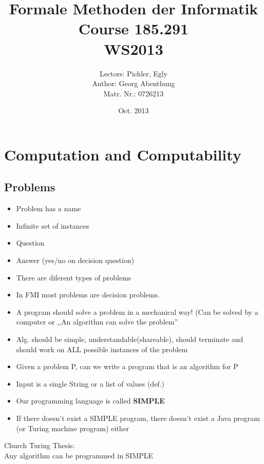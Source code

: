 \documentclass[a4paper]{article}
\begin{document}
	\title{\textbf{Formale Methoden der Informatik}\\ Course 185.291 \\WS2013}
	\author{Lectors: Pichler, Egly \\ Author: Georg Abenthung \\ Matr. Nr.: 0726213
	}
	\date{Oct. 2013}

	\maketitle
	
	\newpage
	
	
	
	\newpage
\section{Computation and Computability}
\subsection{Problems}
\begin{itemize}
  \item {Problem has a name}
  \item {Infinite set of instances}
  \item {Question}
  \item {Answer (yes/no on decision question)}
  \item There are diferent types of problems
  \item In FMI most problems are decision problems.
  \item A program should solve a problem in a mechanical way! (Can be solved by
  a computer or ,,An algorithm can solve the problem''
  \item Alg. should be simple, understandable(shareable), should terminate and
  should work on ALL possible instances of the problem
  \item Given a problem P, can we write a program that is an algorithm for P
  \item Input is a single String or a list of values (def.)
  \item Our programming language is called \textbf{SIMPLE}
  \item If there doesn't exist a SIMPLE program, there doesn't exist a Java
  program (or Turing machine program) either
 \end{itemize}\begin{framed}Church Turing Thesis:\\ Any algorithm can be programmed
in SIMPLE
\end{framed}
\end{document}
